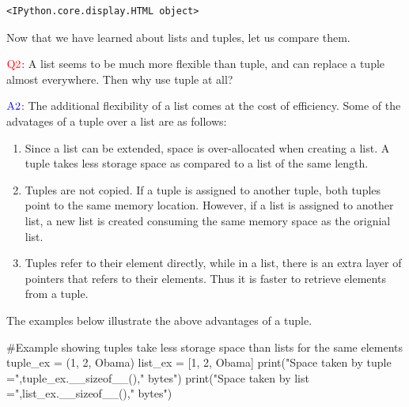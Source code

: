 \documentclass[
  letterpaper,
  DIV=11,
  numbers=noendperiod]{scrreprt}
\newenvironment{Shaded}{\begin{snugshade}}{\end{snugshade}}
\newcommand{\BuiltInTok}[1]{\textcolor[rgb]{0.00,0.23,0.31}{#1}}
\newcommand{\CommentTok}[1]{\textcolor[rgb]{0.37,0.37,0.37}{#1}}
\newcommand{\DecValTok}[1]{\textcolor[rgb]{0.68,0.00,0.00}{#1}}
\newcommand{\NormalTok}[1]{\textcolor[rgb]{0.00,0.23,0.31}{#1}}
\newcommand{\OperatorTok}[1]{\textcolor[rgb]{0.37,0.37,0.37}{#1}}
\newcommand{\StringTok}[1]{\textcolor[rgb]{0.13,0.47,0.30}{#1}}
\begin{document}
\begin{verbatim}
<IPython.core.display.HTML object>
\end{verbatim}

Now that we have learned about lists and tuples, let us compare them.

\(\color{red}{\text{Q2}}\): A list seems to be much more flexible than
tuple, and can replace a tuple almost everywhere. Then why use tuple at
all?

\(\color{blue}{\text{A2}}\): The additional flexibility of a list comes
at the cost of efficiency. Some of the advatages of a tuple over a list
are as follows:

\begin{enumerate}
\def\labelenumi{\arabic{enumi}.}
\item
  Since a list can be extended, space is over-allocated when creating a
  list. A tuple takes less storage space as compared to a list of the
  same length.
\item
  Tuples are not copied. If a tuple is assigned to another tuple, both
  tuples point to the same memory location. However, if a list is
  assigned to another list, a new list is created consuming the same
  memory space as the orignial list.
\item
  Tuples refer to their element directly, while in a list, there is an
  extra layer of pointers that refers to their elements. Thus it is
  faster to retrieve elements from a tuple.
\end{enumerate}

The examples below illustrate the above advantages of a tuple.

\begin{Shaded}
\begin{Highlighting}[]
\CommentTok{\#Example showing tuples take less storage space than lists for the same elements}
\NormalTok{tuple\_ex }\OperatorTok{=}\NormalTok{ (}\DecValTok{1}\NormalTok{, }\DecValTok{2}\NormalTok{, }\StringTok{\textquotesingle{}Obama\textquotesingle{}}\NormalTok{)}
\NormalTok{list\_ex }\OperatorTok{=}\NormalTok{ [}\DecValTok{1}\NormalTok{, }\DecValTok{2}\NormalTok{, }\StringTok{\textquotesingle{}Obama\textquotesingle{}}\NormalTok{]}
\BuiltInTok{print}\NormalTok{(}\StringTok{"Space taken by tuple ="}\NormalTok{,tuple\_ex.\_\_sizeof\_\_(),}\StringTok{" bytes"}\NormalTok{)}
\BuiltInTok{print}\NormalTok{(}\StringTok{"Space taken by list ="}\NormalTok{,list\_ex.\_\_sizeof\_\_(),}\StringTok{" bytes"}\NormalTok{)}
\end{Highlighting}
\end{Shaded}
\end{document}
